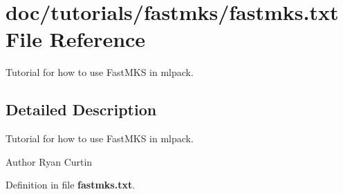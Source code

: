 \section{doc/tutorials/fastmks/fastmks.txt File Reference}
\label{fastmks_8txt}


Tutorial for how to use Fast\-M\-K\-S in mlpack.  




\subsection{Detailed Description}
Tutorial for how to use Fast\-M\-K\-S in mlpack. \begin{DoxyAuthor}{Author}
Ryan Curtin 
\end{DoxyAuthor}


Definition in file {\bf fastmks.\-txt}.


